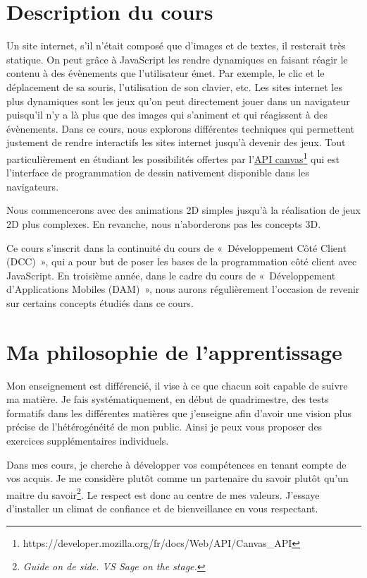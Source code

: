 \section{Description du cours}

Un site internet, s’il n’était composé que d’images et de textes, il resterait très statique. On peut grâce à JavaScript les rendre dynamiques en faisant réagir le contenu à des évènements que l’utilisateur émet. Par exemple, le clic et le déplacement de sa souris, l’utilisation de son clavier, etc. Les sites internet les plus dynamiques sont les jeux qu’on peut directement jouer dans un navigateur puisqu'il n'y a là plus que des images qui s’animent et qui réagissent à des évènements.
Dans ce cours, nous explorons différentes techniques qui permettent justement de rendre interactifs les sites internet jusqu’à devenir des jeux. Tout particulièrement en étudiant les possibilités offertes par l’\href{https://developer.mozilla.org/fr/docs/Web/API/Canvas_API}{API canvas}\footnote{https://developer.mozilla.org/fr/docs/Web/API/Canvas\_API} qui est l'interface  de programmation de dessin nativement disponible dans les navigateurs.

Nous commencerons avec des animations 2D simples jusqu’à la réalisation de jeux 2D plus complexes. En revanche, nous n’aborderons pas les concepts 3D.

Ce cours s’inscrit dans la continuité du cours de «~Développement Côté Client (DCC)~», qui a pour but de poser les bases de la programmation côté client avec JavaScript. En troisième année, dans le cadre du cours de «~Développement d'Applications Mobiles (DAM)~», nous aurons régulièrement l’occasion de revenir sur certains concepts étudiés dans ce cours.
\clearpage
\section{Ma philosophie de l’apprentissage}


Mon enseignement est différencié, il vise à ce que chacun soit capable de suivre ma matière. Je fais systématiquement, en début de quadrimestre, des tests formatifs dans les différentes matières que j'enseigne afin d’avoir une vision plus précise de l’hétérogénéité de mon public. Ainsi je peux vous proposer des exercices supplémentaires individuels.\cite{lawrence2004differentiated}

Dans mes cours, je cherche à développer vos compétences en tenant compte de vos acquis. Je me considère plutôt comme un partenaire du savoir plutôt qu'un maitre du savoir\footnote{\textit{Guide on de side. VS Sage on the stage.}}. Le respect est donc au centre de mes valeurs. J’essaye d’installer un climat de confiance et de bienveillance en vous respectant. %

